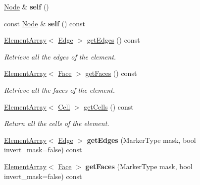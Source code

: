 \begin{DoxyCompactItemize}
\item 
\hypertarget{classINMOST_1_1Node_aecea484b041833ddff1635e4823cd0f2}{\hyperlink{classINMOST_1_1Node}{Node} \& {\bfseries self} ()}\label{classINMOST_1_1Node_aecea484b041833ddff1635e4823cd0f2}

\item 
\hypertarget{classINMOST_1_1Node_ab61e3edc72e68dd7c05a76ae0a9b8b6e}{const \hyperlink{classINMOST_1_1Node}{Node} \& {\bfseries self} () const }\label{classINMOST_1_1Node_ab61e3edc72e68dd7c05a76ae0a9b8b6e}

\item 
\hyperlink{classINMOST_1_1ElementArray}{Element\-Array}$<$ \hyperlink{classINMOST_1_1Edge}{Edge} $>$ \hyperlink{classINMOST_1_1Node_a43ca7289620b6df3347a1d5622350edb}{get\-Edges} () const 
\begin{DoxyCompactList}\small\item\em Retrieve all the edges of the element. \end{DoxyCompactList}\item 
\hyperlink{classINMOST_1_1ElementArray}{Element\-Array}$<$ \hyperlink{classINMOST_1_1Face}{Face} $>$ \hyperlink{classINMOST_1_1Node_a75d85d68fcd08f7d7f54a14d017bfbe2}{get\-Faces} () const 
\begin{DoxyCompactList}\small\item\em Retrieve all the faces of the element. \end{DoxyCompactList}\item 
\hyperlink{classINMOST_1_1ElementArray}{Element\-Array}$<$ \hyperlink{classINMOST_1_1Cell}{Cell} $>$ \hyperlink{classINMOST_1_1Node_a50abc7d16b296a9f6a2e1211dfb1d35a}{get\-Cells} () const 
\begin{DoxyCompactList}\small\item\em Return all the cells of the element. \end{DoxyCompactList}\item 
\hypertarget{classINMOST_1_1Node_a72e9d75a6afd913bf5f8463eb032948e}{\hyperlink{classINMOST_1_1ElementArray}{Element\-Array}$<$ \hyperlink{classINMOST_1_1Edge}{Edge} $>$ {\bfseries get\-Edges} (Marker\-Type mask, bool invert\-\_\-mask=false) const }\label{classINMOST_1_1Node_a72e9d75a6afd913bf5f8463eb032948e}

\item 
\hypertarget{classINMOST_1_1Node_a0174b70bae7e1959f18ff510fb736b89}{\hyperlink{classINMOST_1_1ElementArray}{Element\-Array}$<$ \hyperlink{classINMOST_1_1Face}{Face} $>$ {\bfseries get\-Faces} (Marker\-Type mask, bool invert\-\_\-mask=false) const }\label{classINMOST_1_1Node_a0174b70bae7e1959f18ff510fb736b89}


\end{DoxyCompactItemize}
